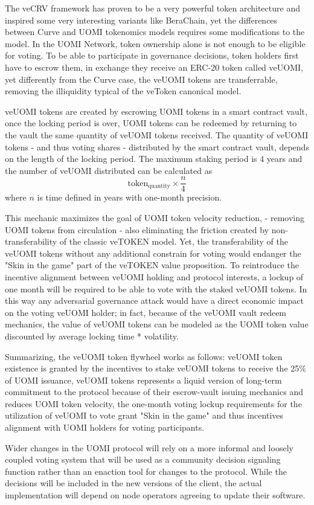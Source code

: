 \documentclass{article}
\begin{document}
The veCRV framework has proven to be a very powerful token architecture and inspired some very interesting variants like BeraChain, yet the differences between Curve and UOMI tokenomics models requires some modifications to the model. 
In the UOMI Network, token ownership alone is not enough to be eligible for voting. To be able to participate in governance decisions, token holders first have to escrow them, in exchange they receive an ERC-20 token called veUOMI, yet differently from the Curve case, the veUOMI tokens are transferrable, removing the illiquidity typical of the veToken canonical model. 


veUOMI tokens are created by escrowing UOMI tokens in a smart contract vault, once the locking period is over, UOMI tokens can be redeemed by returning to the vault the same quantity of veUOMI tokens received. The quantity of veUOMI tokens - and thus voting shares - distributed by the smart contract vault, depends on the length of the locking period. The maximum staking period is 4 years and the number of veUOMI distributed can be calculated as \[
\text{token}_{\scriptstyle\text{quantity}} \times \frac{n}{4}
\]  where \(n\)  is time defined in years with one-month precision. 

This mechanic maximizes the goal of UOMI token velocity reduction, - removing UOMI tokens from circulation -  also eliminating the friction created by non-transferability of the classic veTOKEN model. Yet, the transferability of the veUOMI tokens without any additional constrain for voting would endanger the "Skin in the game" part of the veTOKEN value proposition. To reintroduce the incentive alignment between veUOMI holding and protocol interests, a lockup of one month will be required to be able to vote with the staked veUOMI tokens. In this way any adversarial governance attack would have a direct economic impact on the voting veUOMI holder; in fact, because of the veUOMI vault redeem mechanics, the value of veUOMI tokens can be modeled as the UOMI token value discounted by average locking time * volatility.  

Summarizing, the veUOMI token flywheel works as follows: veUOMI token existence is granted by the incentives to stake veUOMI tokens to receive the 25\% of UOMI issuance, veUOMI tokens represents a liquid version of long-term commitment to the protocol because of their escrow-vault issuing mechanics and reduces UOMI token velocity, the one-month voting lockup requirements for the utilization of veUOMI to vote grant "Skin in the game" and thus incentives alignment with UOMI holders for voting participants.
  

Wider changes in the UOMI protocol will rely on a more informal and loosely coupled voting system that will be used as a community decision signaling function rather than an enaction tool for changes to the protocol. While the decisions will be included in the new versions of the client, the actual implementation will depend on node operators agreeing to update their software.
\end{document}
